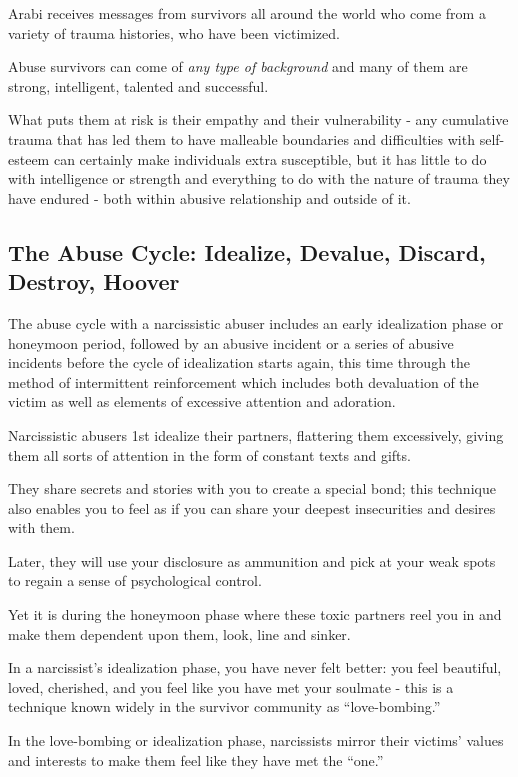 \documentclass[oneside]{book}
\numberwithin{equation}{section}
\begin{document}
Arabi receives messages from survivors all around the world who come from a variety of trauma histories, who have been victimized.

%
Abuse survivors can come of \textit{any type of background} and many of them are strong, intelligent, talented and successful.

What puts them at risk is their empathy and their vulnerability - any cumulative trauma that has led them to have malleable boundaries and difficulties with self-esteem can certainly make individuals extra susceptible, but it has little to do with intelligence or strength and everything to do with the nature of trauma they have endured - both within abusive relationship and outside of it.

\subsection{The Abuse Cycle: Idealize, Devalue, Discard, Destroy, Hoover}
The abuse cycle with a narcissistic abuser includes an early idealization phase or honeymoon period, followed by an abusive incident or a series of abusive incidents before the cycle of idealization starts again, this time through the method of intermittent reinforcement which includes both devaluation of the victim as well as elements of excessive attention and adoration.

Narcissistic abusers 1st idealize their partners, flattering them excessively, giving them all sorts of attention in the form of constant texts and gifts.

They share secrets and stories with you to create a special bond; this technique also enables you to feel as if you can share your deepest insecurities and desires with them.

Later, they will use your disclosure as ammunition and pick at your weak spots to regain a sense of psychological control.

%
Yet it is during the honeymoon phase where these toxic partners reel you in and make them dependent upon them, look, line and sinker.

In a narcissist's idealization phase, you have never felt better: you feel beautiful, loved, cherished, and you feel like you have met your soulmate - this is a technique known widely in the survivor community as ``love-bombing.''

In the love-bombing or idealization phase, narcissists mirror their victims' values and interests to make them feel like they have met the ``one.''
\end{document}
